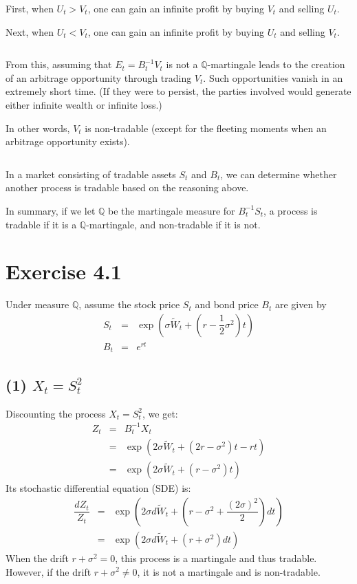 \documentclass[uplatex,a4j,12pt,dvipdfmx]{jsarticle}
\begin{document}
${}$

First, when $U_{t} > V_{t}$, one can gain an infinite profit by buying $V_{t}$ and selling $U_{t}$.

Next, when $U_{t} < V_{t}$, one can gain an infinite profit by buying $U_{t}$ and selling $V_{t}$.

${}$

From this, assuming that $E_{t} = B^{-1}_{t} V_{t}$ is not a $\mathbb{Q}$-martingale leads to the creation of an arbitrage opportunity through trading $V_{t}$. Such opportunities vanish in an extremely short time. (If they were to persist, the parties involved would generate either infinite wealth or infinite loss.)

In other words, $V_{t}$ is non-tradable (except for the fleeting moments when an arbitrage opportunity exists).

${}$

In a market consisting of tradable assets $S_{t}$ and $B_{t}$, we can determine whether another process is tradable based on the reasoning above.

In summary, if we let $\mathbb{Q}$ be the martingale measure for $B^{-1}_{t} S_{t}$, a process is tradable if it is a $\mathbb{Q}$-martingale, and non-tradable if it is not.
\section{Exercise 4.1}

Under measure $\mathbb{Q}$, assume the stock price $S_{t}$ and bond price $B_{t}$ are given by
%
%
\begin{eqnarray*}
	S_{t}
	&=&
	\exp \left(
	\sigma \tilde{W}_{t} +
	\left(
		r - \dfrac{1}{2} \sigma^{2}
		\right)
	t
	\right)
	\\
	B_{t}
	&=&
	e^{rt}
\end{eqnarray*}
%
%

\subsection{(1) $X_{t} = S^{2}_{t}$}

Discounting the process $X_{t} = S^{2}_{t}$, we get:
%
%
\begin{eqnarray*}
	Z_{t}
	&=&
	B^{-1}_{t} X_{t}
	\\ &=&
	\exp \left(
	2 \sigma \tilde{W}_{t} +
	\left(
		2 r - \sigma^{2}
		\right)
	t
	-rt
	\right)
	\\ &=&
	\exp \left(
	2 \sigma \tilde{W}_{t} +
	\left(
		r - \sigma^{2}
		\right)
	t
	\right)
\end{eqnarray*}
%
%
Its stochastic differential equation (SDE) is:
%
%
\begin{eqnarray*}
	\dfrac{dZ_{t}}{Z_{t}}
	&=&
	\exp \left(
	2 \sigma d\tilde{W}_{t}
	+
	\left(
		r - \sigma^{2}
		+\dfrac{(2 \sigma)^{2}}{2}
		\right)
	dt
	\right)
	\\ &=&
	\exp \left(
	2 \sigma d\tilde{W}_{t}
	+
	\left(
		r + \sigma^{2}
		\right)
	dt
	\right)
\end{eqnarray*}
%
%
When the drift $r+\sigma^{2} = 0$, this process is a martingale and thus tradable. However, if the drift $r+\sigma^{2} \neq 0$, it is not a martingale and is non-tradable.
\end{document}
